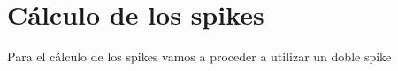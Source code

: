 \chapter{Cálculo de los spikes}

Para el cálculo de los spikes vamos a proceder a utilizar un 
doble spike 